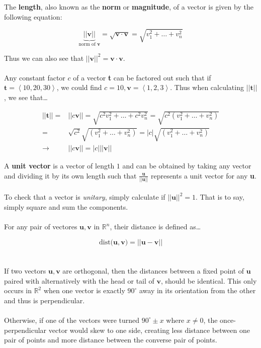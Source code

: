 \documentclass[12pt]{article}
\newcommand{\R}{\mathbb{R}}
\newcommand{\bt}[1]{\textbf{{#1}}}
\newcommand{\bm}[1]{\mathbf{{#1}}}
\newcommand{\vecbrac}[1]{\left\langle{#1}\right\rangle}
\newcommand{\abs}[1]{|{#1}|}
\newcommand{\norm}[1]{||{#1}||}
\begin{document}
The \bt{length}, also known as the \bt{norm} or \bt{magnitude}, of a vector
is given by the following equation:

$$\underbrace{\norm{\bm{v}}}_{\textrm{norm of }\bm{v}} = \sqrt{\bm{v\cdot v}} = \sqrt{v_1^2 + \dots + v_n^2}$$

Thus we can also see that $\norm{\bm{v}}^2 = \bm{v \cdot v}$. \\ \\

Any constant factor $c$ of a vector \bt{t} can be factored out such that
if $\bm{t} = \vecbrac{10, 20, 30}$, we could find $c = 10, \bm{v} =
\vecbrac{1, 2, 3}$. Thus when calculating $\norm{\bm{t}}$, we see that\dots

\begin{align*}
    \norm{\bm{t}} =
    & \norm{c\bm{v}} = \sqrt{c^2v_1^2 + \dots + c^2v_n^2} = \sqrt{c^2(v_1^2 + \dots + v_n^2)} \\ =
    & \sqrt{c^2}\sqrt{(v_1^2 + \dots + v_n^2)} = \abs{c}\sqrt{(v_1^2 + \dots + v_n^2)} \\ \rightarrow
    & \norm{c\bm{v}} = \abs{c}\norm{\bm{v}}
\end{align*}

A \bt{unit vector} is a vector of length $1$ and can be obtained by taking
any vector and dividing it by its own length such that $\frac{\bm{u}}{\norm{\bm{u}}}$
represents a unit vector for any \bt{u}. \\ \\

To check that a vector is \emph{unitary}, simply calculate if $\norm{\bm{u}}^2 = 1$. That is to say,
simply square and sum the components. \\ \\

For any pair of vectores $\bm{u, v}$ in $\R^n$, their distance is defined as\dots

$$\textrm{dist($\bm{u,v}$)} = \norm{\bm{u - v}}$$ \\ \\

If two vectors $\bm{u, v}$ are orthogonal, then the distances between a fixed point of $\bm{u}$
paired with alternatively with  the head or tail of $\bm{v}$, should be identical. This only occurs in $\R^2$ when one vector is
exactly $90^\circ$ away in its orientation from the other and thus is perpendicular. \\ \\

Otherwise, if one of the vectors were turned $90^\circ \pm x$ where $x \neq 0$, the once-perpendicular
vector would skew to one side, creating less distance between one pair of points and more distance
between the converse pair of points. \\ \\
\end{document}
